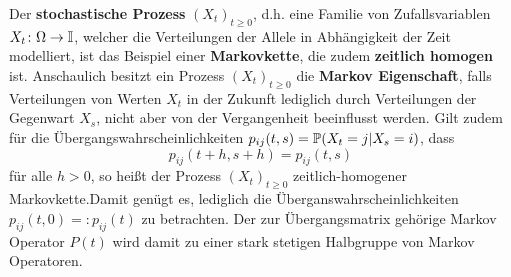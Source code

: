 \documentclass[a4paper]{paper}
\numberwithin{equation}{satz}
\begin{document}
Der \textbf{stochastische Prozess} $(X_t)_{t\geq0}$, d.h. eine Familie von Zufallsvariablen $X_t\colon \Omega\to \I$, welcher die Verteilungen der Allele in Abhängigkeit der Zeit modelliert, ist  das Beispiel einer \textbf{Markovkette}, die zudem \textbf{zeitlich homogen} ist.  Anschaulich besitzt ein Prozess $(X_t)_{t\geq0}$ die  \textbf{Markov Eigenschaft}, falls Verteilungen von Werten $X_t$ in der Zukunft lediglich durch Verteilungen der Gegenwart $X_s$, nicht aber von der Vergangenheit beeinflusst werden. Gilt zudem für die Übergangswahrscheinlichkeiten $p_{ij}(t,s)=\P(X_t=j|X_s=i)$, dass $$p_{ij}(t+h,s+h)=p_{ij}(t,s)$$ für alle $h>0$, so heißt der Prozess $(X_t)_{t\geq0}$ zeitlich-homogener Markovkette.Damit genügt es, lediglich die Überganswahrscheinlichkeiten $p_{ij}(t,0)=:p_{ij}(t)$ zu betrachten. Der zur Übergangsmatrix gehörige Markov Operator $P(t)$ wird damit zu einer stark stetigen Halbgruppe von Markov Operatoren.


\begin{comment}
\begin{defi}[Markovkette]
  Ein  Prozess $(X_t)_{t\geq0}$ heißt   \textit{Markovkette} mit \textit{Anfangsverteilung $\lambda=(\lambda_i)_{i\in\I}$} und \textit{Übergangsmatrix $P=(p_{i,j})_{i,j\in\I}$}, in Zeichen \textit{Markov}($\lambda$,$P$), falls gilt:
  \begin{compactenum}
      \item $\P(X_0=i_0)=\lambda_{i_0}$ für alle $i_0\in\I$, d.h. $X_0$ hat die Verteilung $\lambda$.
      \item $\P(X_{n+1}=i_{n+1}|X_0=i_0,\dots,X_n=i_n)=p_{i_n i_{n+1}}$, d.h. für $n\geq0$ und bedingt auf $X_n=i$ hat $X_{n+1}$ die Verteilung $(p_{i,j})_{j\in\I}$ und ist unabhängig von $X_0,\dots,X_{n-1}$.
  \end{compactenum}
\end{defi}
\end{comment}

\begin{comment}
\begin{defi}[Halbgruppe von Operatoren]
  Sei $X$ Banachraum. Eine Abbildung $T\colon \R_+\to \mathcal L(X)$ heißt \textit{stark stetige Halbgruppe von Operatoren}, falls gilt:
  \begin{compactenum}
      \item $T(0)=I$.
      \item Für alle $s,t\geq0$ ist $T(t+s)=T(t)\cdot T(s)$.
      \item Für alle $x\in X$ ist $\lim_{t\downarrow 0}T(t)x=x$.
  \end{compactenum}
\end{defi}
\end{comment}
\end{document}
